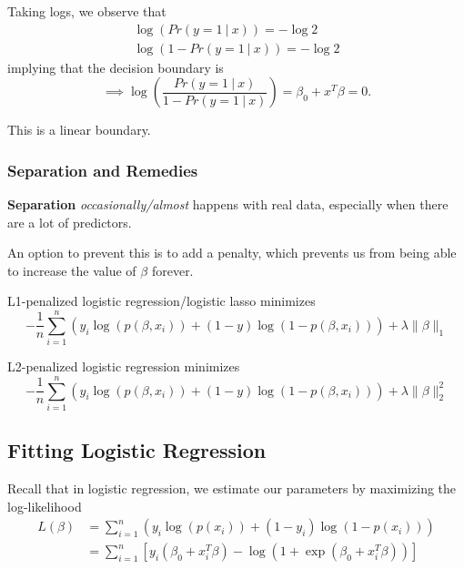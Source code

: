 \documentclass[11pt]{article}
\theoremstyle{definition}
\numberwithin{equation}{section}
\begin{document}
 Taking logs, we observe that
 \begin{gather}
   \log(Pr(y=1\>|\> x))= -\log 2\\
   \log(1 - Pr(y=1\>|\> x))= -\log 2
 \end{gather}
 implying that the decision boundary is
 \begin{equation}
   \implies\log\left( \frac{Pr(y=1\>|\> x)}{1 - Pr(y=1\>|\> x)} \right)=\beta_0+x^T\beta=0.
 \end{equation}
\begin{writenotes}
  This is a linear boundary.
\end{writenotes}

\subsubsection{Separation and Remedies}

\textbf{Separation} \textit{occasionally/almost} happens with real data, especially when there are a lot of predictors.

An option to prevent this is to add a penalty, which prevents us from being able to increase the value of $\beta$ forever.

\begin{indent}
  L1-penalized logistic regression/logistic lasso minimizes
  \begin{equation}
  -\frac{1}{n}\sum^n_{i=1}(y_i\log(p(\beta,x_i)) + (1-y)\log(1-p(\beta, x_i))) + \lambda\| \beta \|_1
  \end{equation}

  L2-penalized logistic regression minimizes
  \begin{equation}
  -\frac{1}{n}\sum^n_{i=1}(y_i\log(p(\beta,x_i)) + (1-y)\log(1-p(\beta, x_i))) + \lambda\| \beta \|^2_2
  \end{equation}
\end{indent}

\newpage
\subsection{Fitting Logistic Regression}

Recall that in logistic regression, we estimate our parameters by maximizing the log-likelihood
\begin{align}
  L(\beta) &= \sum^n_{i=1}(y_i\log(p(x_i)) + (1 - y_i)\log(1 - p(x_i)))\\
  &=\sum^n_{i=1}\left[ y_i(\beta_0 + x_i^T\beta) - \log\left(1 + \exp(\beta_0+x_i^T\beta)\right) \right]
\end{align}
\end{document}
